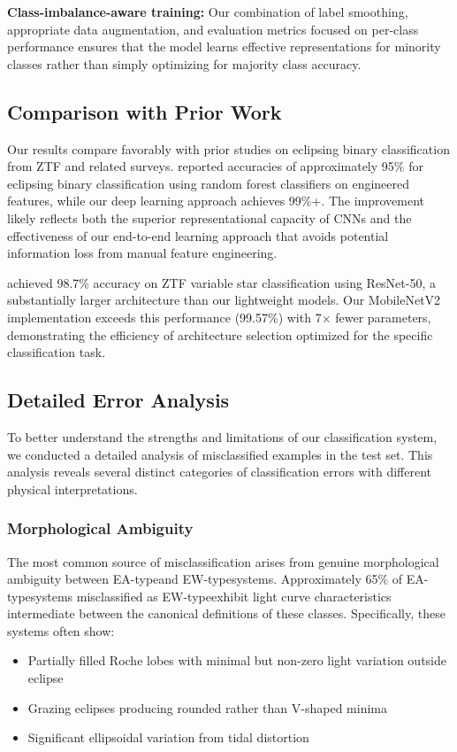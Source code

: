 \documentclass[11pt,a4paper]{article}
\newcommand{\EA}{EA-type}
\newcommand{\EW}{EW-type}
\begin{document}
\textbf{Class-imbalance-aware training:} Our combination of label smoothing, appropriate data augmentation, and evaluation metrics focused on per-class performance ensures that the model learns effective representations for minority classes rather than simply optimizing for majority class accuracy.

\subsection{Comparison with Prior Work}

Our results compare favorably with prior studies on eclipsing binary classification from ZTF and related surveys. \citet{aleo2023ztf} reported accuracies of approximately 95\% for eclipsing binary classification using random forest classifiers on engineered features, while our deep learning approach achieves 99\%+. The improvement likely reflects both the superior representational capacity of CNNs and the effectiveness of our end-to-end learning approach that avoids potential information loss from manual feature engineering.

\citet{chen2020photometric} achieved 98.7\% accuracy on ZTF variable star classification using ResNet-50, a substantially larger architecture than our lightweight models. Our MobileNetV2 implementation exceeds this performance (99.57\%) with 7$\times$ fewer parameters, demonstrating the efficiency of architecture selection optimized for the specific classification task.

\subsection{Detailed Error Analysis}

To better understand the strengths and limitations of our classification system, we conducted a detailed analysis of misclassified examples in the test set. This analysis reveals several distinct categories of classification errors with different physical interpretations.

\subsubsection{Morphological Ambiguity}

The most common source of misclassification arises from genuine morphological ambiguity between \EA and \EW systems. Approximately 65\% of \EA systems misclassified as \EW exhibit light curve characteristics intermediate between the canonical definitions of these classes. Specifically, these systems often show:
\begin{itemize}
    \item Partially filled Roche lobes with minimal but non-zero light variation outside eclipse
    \item Grazing eclipses producing rounded rather than V-shaped minima
    \item Significant ellipsoidal variation from tidal distortion
\end{itemize}
\end{document}
